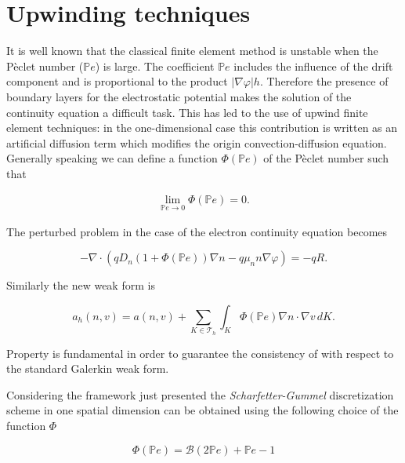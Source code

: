 \section{Upwinding techniques}

It is well known that the classical finite element method is unstable when the P\`eclet number ($\mathbb{P}e$) is large. The coefficient $\mathbb{P}e$ includes the influence of the drift component and is proportional to the product $|\nabla \varphi| h$. Therefore the presence of boundary layers for the electrostatic potential makes the solution of the continuity equation a difficult task. This has led to the use of upwind finite element techniques: in the one-dimensional case this contribution is written as an artificial diffusion term which modifies the origin convection-diffusion equation. Generally speaking we can define a function $\Phi(\mathbb{P}e)$ of the P\`eclet number such that

\begin{align}
\label{eq: consistenza}
\lim_{\mathbb{P}e \to 0} \Phi(\mathbb{P}e) = 0.
\end{align}

The perturbed problem in the case of the electron continuity equation becomes

\begin{equation}
\label{eq: perturbed problem}
- \nabla \cdot (qD_n(1+\Phi(\mathbb{P}e))\nabla n - q \mu_n n \nabla \varphi) = -qR.
\end{equation}

Similarly the new weak form is

\begin{equation}
\label{eq: weak form perturbed}
a_h(n,v) = a(n,v) + \sum_{K\in \mathcal{T}_h}\int_{K} \Phi(\mathbb{P}e) \nabla n \cdot \nabla v \, dK.
\end{equation}

Property  is fundamental in order to guarantee the consistency of  with respect to the standard Galerkin weak form.

Considering the framework just presented the \textit{Scharfetter-Gummel} discretization scheme in one spatial dimension can be obtained using the following choice of the function $\Phi$

\begin{equation}
\label{eq: phi per SG 1D}
\Phi(\mathbb{P}e) = \mathcal{B}(2\mathbb{P}e) + \mathbb{P}e -1
\end{equation}

